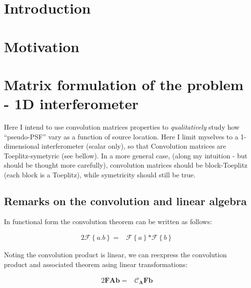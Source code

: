 
\section{Introduction}
\section{Motivation}
\section{Matrix formulation of the problem - 1D interferometer}

Here I intend to use convolution matrices properties to {\it qualitatively} study how ``pseudo-PSF'' vary as a
function of source location. Here I limit myselves to a 1-dimensional
interferometer (scalar only), so that
Convolution matrices are Toeplitz-symetyric (see bellow). In a more
general case, (along my intuition - but should be thought more
carefully), convolution matrices should be block-Toeplitz (each
block is a Toeplitz), while symetricity should still be true. 

\subsection{Remarks on the convolution and linear algebra}

In functional form the convolution theorem can be written as follows:


\def\F{\mathcal{F}}
\def\Fm{\bm{F}}
\def\Gauss{\bm{\mathcal{G}}}
\def\conv{\mathcal{*}}

\begin{alignat}{2}
\F \left\{  a.b\right\}=& \F \left\{a\right\}\conv\F \left\{b\right\}
\end{alignat}

Noting the convolution product is linear, we can reexpress the
convolution product and associated theorem asing linear
transformations:

\newcommand{\C}[1]{\bm{\mathcal{C}}_{#1}}
\newcommand{\vv}[1]{\bm{#1}}
\def\one{\bm{1}}


\begin{alignat}{2}
\label{eq:ConvTh}
\Fm \vv{A}\vv{b}=& \C{\vv{A}}\Fm \vv{b}
\end{alignat}

